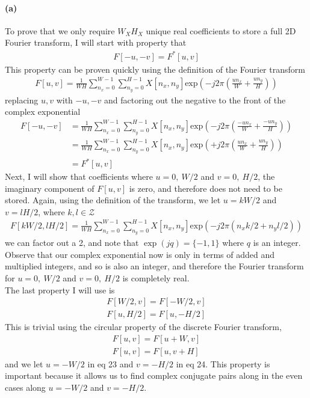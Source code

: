 \documentclass{article}
\newcommand{\spart}[1]{\paragraph{(#1)}}
\begin{document}
\spart{a} To prove that we only require $W_X H_X$ unique real coefficients to store a full 2D Fourier transform, I will start with property that 
\begin{align}
	F[-u,-v] = F^*[u,v]
\end{align}
This property can be proven quickly using the definition of the Fourier transform
\begin{align}
	F[u,v] = \frac{1}{WH}\sum_{n_x=0}^{W-1}\sum_{n_y=0}^{H-1} X[n_x,n_y]\text{exp}\left(-j 2\pi \left(\frac{u n_x}{W}+\frac{u n_y}{H}\right)\right)
\end{align}
replacing $u,v$ with $-u,-v$ and factoring out the negative to the front of the complex exponential
\begin{align}
	F[-u,-v] &= \frac{1}{WH}\sum_{n_x=0}^{W-1}\sum_{n_y=0}^{H-1} X[n_x,n_y]\text{exp}\left(-j 2\pi \left(\frac{-u n_x}{W}+\frac{-u n_y}{H}\right)\right) \\
	&= \frac{1}{WH}\sum_{n_x=0}^{W-1}\sum_{n_y=0}^{H-1} X[n_x,n_y]\text{exp}\left(+j 2\pi \left(\frac{u n_x}{W}+\frac{u n_y}{H}\right)\right) \\
	&= F^*[u,v]
\end{align}
Next, I will show that coefficients where $u = 0, \ W/2$ and $v = 0, \ H/2$, the imaginary component of $F[u,v]$ is zero, and therefore does not need to be stored. Again, using the definition of the transform, we let $u=k W/2$ and $v=l H/2$, where $k,l \in \mathcal{Z}$
\begin{align}
	F[k W/2,l H/2] = \frac{1}{WH}\sum_{n_x=0}^{W-1}\sum_{n_y=0}^{H-1} X[n_x,n_y]\text{exp}\left(-j 2\pi \left(n_x k/2 + n_y l/2\right)\right)
\end{align}
we can factor out a 2, and note that $\exp(j q) = \{-1,1\}$ where $q$ is an integer. Observe that our complex exponential now is only in terms of added and multiplied integers, and so is also an integer, and therefore the Fourier transform for $u = 0, \ W/2$ and $v = 0, \ H/2$ is completely real.\\
The last property I will use is  
\begin{align}
	F[W/2,v] = F[-W/2,v] \\
	F[u,H/2] = F[u,-H/2]
\end{align}
This is trivial using the circular property of the discrete Fourier transform,
\begin{align}
	F[u,v] = F[u+W,v] \\
	F[u,v] = F[u,v+H]
\end{align}
and we let $u = -W/2$ in eq 23 and $v = -H/2$ in eq 24. This property is important because it allows us to find complex conjugate pairs along in the even cases along $u = -W/2$ and $v = -H/2$.
\end{document}
